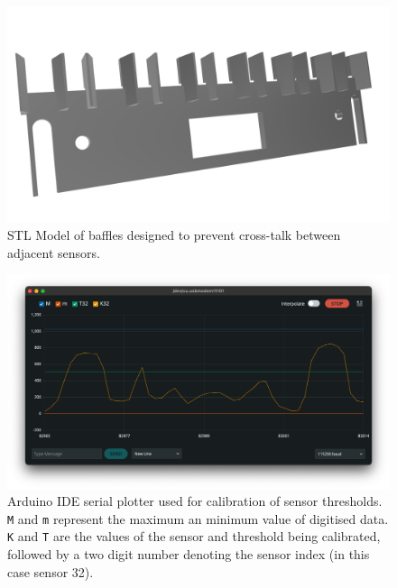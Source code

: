 \begin{figure}
    \centering
    \includegraphics[width=\linewidth]{src/images/baffles.png}
    \caption{STL Model of baffles designed to prevent cross-talk between adjacent sensors.}
    \label{fig:baffles}
\end{figure}

\begin{figure}
    \centering
    \includegraphics[width=\linewidth]{src/images/serial_monitor.png}
    \caption{Arduino IDE serial plotter used for calibration of sensor thresholds. \texttt{M} and \texttt{m} represent the maximum an minimum value of digitised data. \texttt{K} and \texttt{T} are the values of the sensor and threshold being calibrated, followed by a two digit number denoting the sensor index (in this case sensor 32).}
    \label{fig:serial_monitor}
\end{figure}


